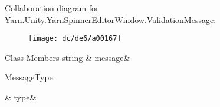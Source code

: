 Collaboration diagram for Yarn.\-Unity.\-Yarn\-Spinner\-Editor\-Window.\-Validation\-Message\-:
\nopagebreak
\begin{figure}[H]
\begin{center}
\leavevmode
\texttt{[image: dc/de6/a00167]}
\end{center}
\end{figure}
\begin{DoxyFields}{Class Members}
\hypertarget{a00085_a636dce6708e779c201fa5e7d01cf2955}{string}\label{a00085_a636dce6708e779c201fa5e7d01cf2955}
&
message&
\\
\hline

\hypertarget{a00085_a7d342190c7657fbbe85eb6fa66bcabb8}{Message\-Type}\label{a00085_a7d342190c7657fbbe85eb6fa66bcabb8}
&
type&
\\
\hline

\end{DoxyFields}
